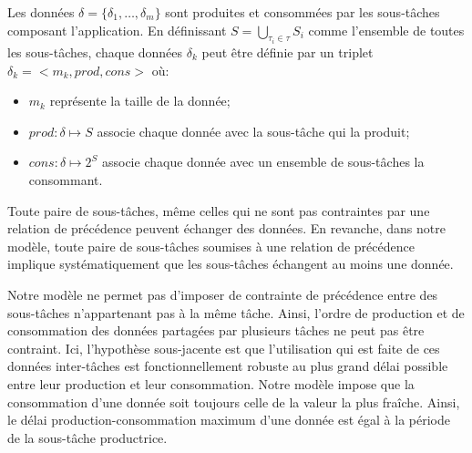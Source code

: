 \documentclass[main.tex]{subfiles}
\begin{document}
Les données $\delta = \{ \delta_1 , \ldots , \delta_m \}$ sont produites et consommées par les sous-tâches composant l'application. En définissant $S = \underset{\tau_i \in \tau}{\bigcup} S_i$ comme l'ensemble de toutes les sous-tâches, chaque données $\delta_k$ peut être définie par un triplet $\delta_k = <m_k , prod, cons>$ où:
\begin{itemize}
    \item $m_k$ représente la taille de la donnée;
    \item $prod : \delta \mapsto S$ associe chaque donnée avec la sous-tâche qui la produit;
    \item $cons : \delta \mapsto 2^S$ associe chaque donnée avec un ensemble de sous-tâches la consommant.
\end{itemize}

Toute paire de sous-tâches, même celles qui ne sont pas contraintes par une relation de précédence peuvent échanger des données. En revanche, dans notre modèle, toute paire de sous-tâches soumises à une relation de précédence implique systématiquement que les sous-tâches échangent au moins une donnée.

Notre modèle ne permet pas d'imposer de contrainte de précédence entre des sous-tâches n'appartenant pas à la même tâche. Ainsi, l'ordre de production et de consommation des données partagées par plusieurs tâches ne peut pas être contraint. Ici, l'hypothèse sous-jacente est que l'utilisation qui est faite de ces données inter-tâches est fonctionnellement robuste au plus grand délai possible entre leur production et leur consommation. Notre modèle impose que la consommation d'une donnée soit toujours celle de la valeur la plus fraîche. Ainsi, le délai production-consommation maximum d'une donnée est égal à la période de la sous-tâche productrice.
\end{document}
